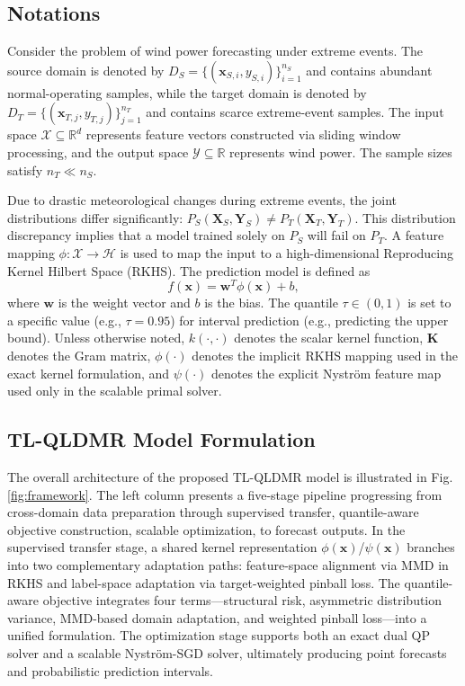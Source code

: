 \documentclass[a4paper]{cas-sc}
\begin{document}
\subsection{Notations}\label{not}
Consider the problem of wind power forecasting under extreme events. The source domain is denoted by $D_{S} = \{(\boldsymbol{x}_{S,i}, y_{S,i})\}_{i=1}^{n_S}$ and contains abundant normal-operating samples, while the target domain is denoted by $D_{T} = \{(\boldsymbol{x}_{T,j}, y_{T,j})\}_{j=1}^{n_T}$ and contains scarce extreme-event samples. The input space $\mathcal{X} \subseteq \mathbb{R}^d$ represents feature vectors constructed via sliding window processing, and the output space $\mathcal{Y} \subseteq \mathbb{R}$ represents wind power. The sample sizes satisfy $n_T \ll n_S$.

Due to drastic meteorological changes during extreme events, the joint distributions differ significantly: $P_S(\boldsymbol{X}_S, \boldsymbol{Y}_S) \neq P_T(\boldsymbol{X}_T, \boldsymbol{Y}_T)$. This distribution discrepancy implies that a model trained solely on $P_S$ will fail on $P_T$.
A feature mapping $\phi: \mathcal{X} \to \mathcal{H}$ is used to map the input to a high-dimensional Reproducing Kernel Hilbert Space (RKHS). The prediction model is defined as
\begin{equation}
f(\boldsymbol{x}) = \boldsymbol{w}^T \phi(\boldsymbol{x}) + b,
\end{equation}
where $\boldsymbol{w}$ is the weight vector and $b$ is the bias. The quantile $\tau \in (0, 1)$ is set to a specific value (e.g., $\tau=0.95$) for interval prediction (e.g., predicting the upper bound).
Unless otherwise noted, $k(\cdot,\cdot)$ denotes the scalar kernel function, $\boldsymbol{K}$ denotes the Gram matrix, $\phi(\cdot)$ denotes the implicit RKHS mapping used in the exact kernel formulation, and $\psi(\cdot)$ denotes the explicit Nystr\"{o}m feature map used only in the scalable primal solver.

\subsection{TL-QLDMR Model Formulation}\label{MODEL}
The overall architecture of the proposed TL-QLDMR model is illustrated in Fig. \ref{fig:framework}. The left column presents a five-stage pipeline progressing from cross-domain data preparation through supervised transfer, quantile-aware objective construction, scalable optimization, to forecast outputs. In the supervised transfer stage, a shared kernel representation $\phi(\mathbf{x})$/$\psi(\mathbf{x})$ branches into two complementary adaptation paths: feature-space alignment via MMD in RKHS and label-space adaptation via target-weighted pinball loss. The quantile-aware objective integrates four terms---structural risk, asymmetric distribution variance, MMD-based domain adaptation, and weighted pinball loss---into a unified formulation. The optimization stage supports both an exact dual QP solver and a scalable Nystr\"{o}m-SGD solver, ultimately producing point forecasts and probabilistic prediction intervals.
\end{document}
